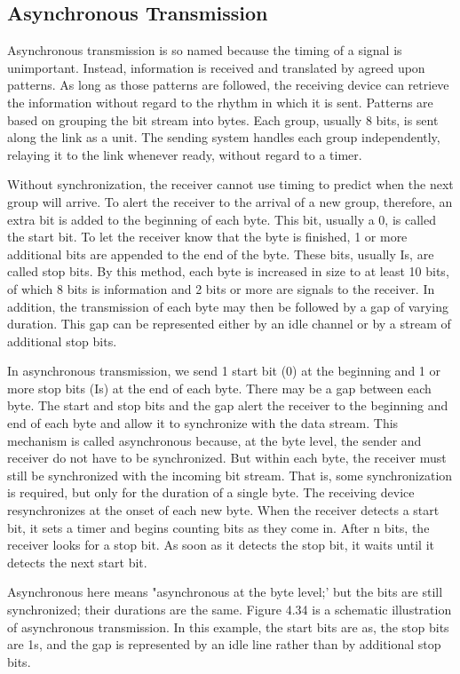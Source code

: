 \subsection*{Asynchronous Transmission}
Asynchronous transmission is so named because the timing of a signal is unimportant. Instead, information is received and translated by agreed upon patterns. As long as those patterns are followed, the receiving device can retrieve the information without regard to the rhythm in which it is sent. Patterns are based on grouping the bit stream into bytes. Each group, usually 8 bits, is sent along the link as a unit. The sending system handles each group independently, relaying it to the link whenever ready, without regard to a timer.

Without synchronization, the receiver cannot use timing to predict when the next group will arrive. To alert the receiver to the arrival of a new group, therefore, an extra bit is added to the beginning of each byte. This bit, usually a 0, is called the start bit. To let the receiver know that the byte is finished, 1 or more additional bits are appended to the end of the byte. These bits, usually Is, are called stop bits. By this method, each byte is increased in size to at least 10 bits, of which 8 bits is information and 2 bits or more are signals to the receiver. In addition, the transmission of each byte may then be followed by a gap of varying duration. This gap can be represented either by an idle channel or by a stream of additional stop bits.

In asynchronous transmission, we send 1 start bit (0) at the beginning and 1 or more stop bits (Is) at the end of each byte. There may be a gap between each byte. The start and stop bits and the gap alert the receiver to the beginning and end of each byte and allow it to synchronize with the data stream. This mechanism is called asynchronous because, at the byte level, the sender and receiver do not have to be synchronized. But within each byte, the receiver must still be synchronized with the incoming bit stream. That is, some synchronization is required, but only for the duration of a single byte. The receiving device resynchronizes at the onset of each new byte. When the receiver detects a start bit, it sets a timer and begins counting bits as they come in. After n bits, the receiver looks for a stop bit. As soon as it detects the stop bit, it waits until it detects the next start bit.

Asynchronous here means "asynchronous at the byte level;' but the bits are still synchronized; their durations are the same. Figure 4.34 is a schematic illustration of asynchronous transmission. In this example, the start bits are as, the stop bits are 1s, and the gap is represented by an idle line rather than by additional stop bits.


